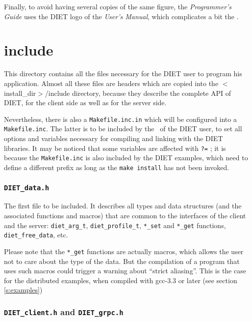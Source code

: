 Finally, to avoid having several copies of the same figure, the
\textit{Programmer's Guide} uses the DIET logo of the \textit{User's Manual},
which complicates a bit the \makeam.



\section{\textsf{include}}
\label{s:include}

This directory contains all the files necessary for the DIET user to program his
application. Almost all these files are headers which are copied into the
\textsf{$<$install\_dir$>$/include} directory, because they describe the
complete API of DIET, for the client side as well as for the server side.

Nevertheless, there is also a \texttt{Makefile.inc.in} which will be configured
into a \texttt{Makefile.inc}. The latter is to be included by the \make\ of the
DIET user, to set all options and variables necessary for compiling and linking
with the DIET libraries. It may be noticed that some variables are affected with
\texttt{?=} ; it is because the \texttt{Makefile.inc} is also included by the
DIET examples, which need to define a different prefix as long as the
\texttt{make install} has not been invoked.



\subsubsection{\tt DIET\_data.h}

The first file to be included. It describes all types and data structures (and
the associated functions and macros) that are common to the interfaces of the
client and the server: \verb+diet_arg_t+, \verb+diet_profile_t+, \verb+*_set+
and \verb+*_get+ functions, \verb+diet_free_data+, etc.

Please note that the \verb+*_get+ functions are actually macros, which allows
the user not to care about the type of the data. But the compilation of a
program that uses such macros could trigger a warning about ``strict aliasing''.
This is the case for the distributed examples, when compiled with
\textsf{gcc-3.3} or later (see section \ref{s:examples})


\subsubsection{{\tt DIET\_client.h} and {\tt DIET\_grpc.h}}

